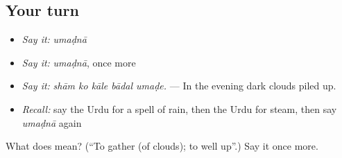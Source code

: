 \subsection*{Your turn}
\begin{itemize}
\raggedright
  \item \emph{Say it:} \emph{umaḍnā}
  \item \emph{Say it:} \emph{umaḍnā}, once more
  \item \emph{Say it:} \emph{shām ko kāle bādal umaḍe.} — In the evening dark clouds piled up.
  \item \emph{Recall:} say the Urdu for a spell of rain, then the Urdu for steam, then say \emph{umaḍnā} again
\end{itemize}

\begin{tcolorbox}[breakable,colback=teal!4,colframe=teal!35!black,title={Before you move on}]
What does  mean? (\textquotedblleft{}To gather (of clouds); to well up\textquotedblright{}.) Say it once more.
\end{tcolorbox}
